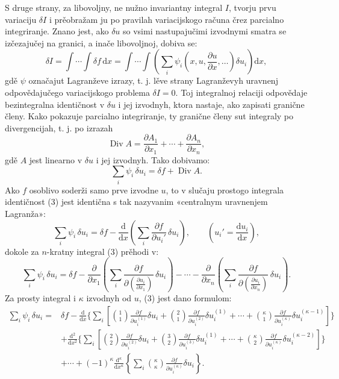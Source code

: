 \documentclass[11pt]{article}
\providecommand{\p}{\partial}
\providecommand{\dd}{\mathrm d}
\DeclareMathOperator{\Div}{Div}
\begin{document}
S druge strany, za libovoljny, ne nužno invariantny integral \(I\), tvorju prvu variaciju \(\delta I\) i prěobražam ju po pravilah variacijskogo računa črez parcialno integriranje. Znano jest, ako \(\delta u\) so vsimi nastupajučimi izvodnymi smatra se izčezajučej na granici, a inače libovoljnoj, dobiva se:
\begin{equation}
\delta I=\int\!\cdots\!\int \delta f\,\dd x
=\int\!\cdots\!\int\left(\sum_i\psi_i\!\left(x,u,\frac{\p u}{\p x},\ldots\right)\delta u_i\right)\dd x,
\tag{2}
\end{equation}
gdě \(\psi\) označajut Lagranževe izrazy, t. j. lěve strany Lagranževyh uravnenj odpovědajučego variacijskogo problema \(\delta I=0\). Toj integralnoj relaciji odpovědaje bezintegralna identičnost v \(\delta u\) i jej izvodnyh, ktora nastaje, ako zapisati granične členy. Kako pokazuje parcialno integriranje, ty granične členy sut integraly po divergencijah, t. j. po izrazah
\[
\Div A=\frac{\p A_1}{\p x_1}+\cdots+\frac{\p A_n}{\p x_n},
\]
gdě \(A\) jest linearno v \(\delta u\) i jej izvodnyh. Tako dobivamo:
\begin{equation}
\sum_i\psi_i\,\delta u_i=\delta f+\Div A.
\tag{3}
\end{equation}
Ako \(f\) osoblivo soderži samo prve izvodne \(u\), to v slučaju prostogo integrala identičnost (3) jest identična s tak nazyvanim «centralnym uravnenjem Lagranža»:
\begin{equation}
\sum_i \psi_i\,\delta u_i
=\delta f-\frac{\dd}{\dd x}\left(\sum_i\frac{\p f}{\p u_i'}\,\delta u_i\right),
\qquad \left(u_i'=\frac{\dd u_i}{\dd x}\right),
\tag{4}
\end{equation}
dokole za \(n\)-kratny integral (3) prěhodi v:
\begin{equation}
\sum_i\psi_i\,\delta u_i
=
\delta f
-\frac{\p}{\p x_1}\left(\sum_i\frac{\p f}{\p \left(\frac{\p u_i}{\p x_1}\right)}\,\delta u_i\right)
-\cdots
-\frac{\p}{\p x_n}\left(\sum_i\frac{\p f}{\p \left(\frac{\p u_i}{\p x_n}\right)}\,\delta u_i\right).
\tag{5}
\end{equation}
Za prosty integral i \(\kappa\) izvodnyh od \(u\), (3) jest dano formulom:
\begin{equation}
\begin{aligned}
\sum_i\psi_i\,\delta u_i
={}&\delta f
-\frac{\dd}{\dd x}\Bigg\{\sum_i\left[
\binom{1}{1}\frac{\p f}{\p u_i^{(1)}}\delta u_i
+\binom{2}{1}\frac{\p f}{\p u_i^{(2)}}\delta u_i^{(1)}
+\cdots+
\binom{\kappa}{1}\frac{\p f}{\p u_i^{(\kappa)}}\delta u_i^{(\kappa-1)}
\right]\Bigg\}\\
&+\frac{\dd^2}{\dd x^2}\Bigg\{\sum_i\left[
\binom{2}{2}\frac{\p f}{\p u_i^{(2)}}\delta u_i
+\binom{3}{2}\frac{\p f}{\p u_i^{(3)}}\delta u_i^{(1)}
+\cdots+
\binom{\kappa}{2}\frac{\p f}{\p u_i^{(\kappa)}}\delta u_i^{(\kappa-2)}
\right]\Bigg\}\\
&+\cdots
+(-1)^\kappa\frac{\dd^\kappa}{\dd x^\kappa}
\left\{\sum_i\binom{\kappa}{\kappa}
\frac{\p f}{\p u_i^{(\kappa)}}\delta u_i\right\}.
\end{aligned}
\tag{6}
\end{equation}
\end{document}
